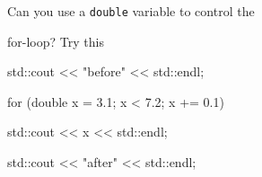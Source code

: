 Can you use a \texttt{double} variable to control the

for-loop? Try this

\begin{console}

std::cout << "before" << std::endl;



for (double x = 3.1; x < 7.2; x += 0.1)

{

        std::cout << x << std::endl;

}



std::cout << "after" << std::endl;

\end{console}

